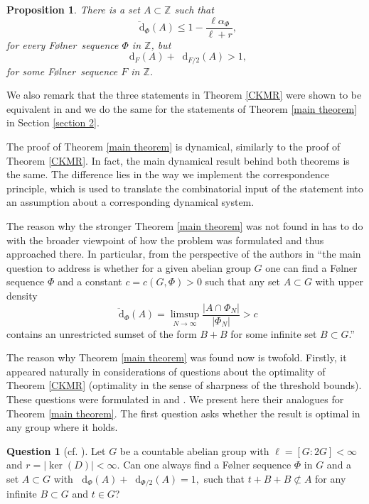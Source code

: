 \documentclass[reqno]{amsart}
\def\Z{{\mathbb Z}}
\newcommand*\diff{\mathop{}\!\mathrm{d}}
\newtheorem{proposition}[theorem]{Proposition}
\theoremstyle{definition}
\newtheorem{question}[theorem]{Question}
\theoremstyle{remark}
\theoremstyle{remark}
\newcommand{\Folner}{F\o{}lner}
\begin{document}
\begin{proposition}\label{no reverse implication of main theorems intro}
There is a set 
$A\subset \Z$ such that 
$$\overline{\diff}_{\Phi}(A) \leq 1-\frac{\ell \alpha_{\Phi}}{\ell+r},$$
for every \Folner\ sequence $\Phi$ in $\Z$, but 
$$\diff_{F}(A)+\diff_{F/2}(A)>1, $$
for some \Folner\ sequence $F$ in $\Z$.
\end{proposition}


We also remark that the three statements in Theorem \ref{CKMR} were shown to be equivalent in \cite{charamaras_kousek_mountakis_radic2025BBingroups} and we do the same for the statements of Theorem \ref{main theorem} in Section \ref{section 2}.

The proof of Theorem \ref{main theorem} is dynamical, 
similarly to the proof of Theorem \ref{CKMR}. In fact, the 
main dynamical result behind both theorems is the same. The 
difference lies in the way we implement the correspondence principle, which is used to translate the combinatorial input 
of the statement into an assumption about a corresponding
dynamical system. 

The reason why the stronger Theorem \ref{main theorem} was 
not found in 
\cite{charamaras_kousek_mountakis_radic2025BBingroups} 
has to do with the broader viewpoint of how the problem was 
formulated and thus approached there. In particular, from the perspective of the authors in \cite{charamaras_kousek_mountakis_radic2025BBingroups} ``the main question to address is whether for a given abelian group $G$ one can find a \Folner{} sequence $\Phi$ and a constant $c=c(G,\Phi)>0$ such that any set $A\subset G$ with upper density 
$$\overline{\diff}_\Phi(A) = \limsup_{N \to \infty} \frac{|A \cap \Phi_N|}{|\Phi_N|}>c$$ 
contains an unrestricted sumset of the form $B+B$ for some 
infinite set $B\subset G$.'' 

The reason why Theorem \ref{main theorem} was found now is 
twofold. Firstly, it appeared naturally in considerations of 
questions about the optimality of Theorem \ref{CKMR} 
(optimality in the 
sense of sharpness of the threshold bounds). These questions 
were formulated in \cite[Question 1.6]{charamaras_kousek_mountakis_radic2025BBingroups} and \cite[Question 1.7]{charamaras_kousek_mountakis_radic2025BBingroups}. We present here their analogues for Theorem \ref{main theorem}.
The first question asks whether the result is 
optimal in any group where it holds. 

\begin{question}[{cf. {\cite[Question 1.7]{charamaras_kousek_mountakis_radic2025BBingroups}}}] \label{open_qu_1}
Let $G$ be a countable abelian group with $\ell=[G:2G]<\infty$ and 
$r=|\ker(D)|<\infty$. Can one always find a \Folner{} sequence $\Phi$ in $G$ and a set  
$A\subset G$ with 
$\diff_{\Phi}(A)+\diff_{\Phi/2}(A)=1,$ 
such that $t+B+B \not \subset A$ for any infinite $B\subset G$ and $t\in G$?
\end{question}
\end{document}
